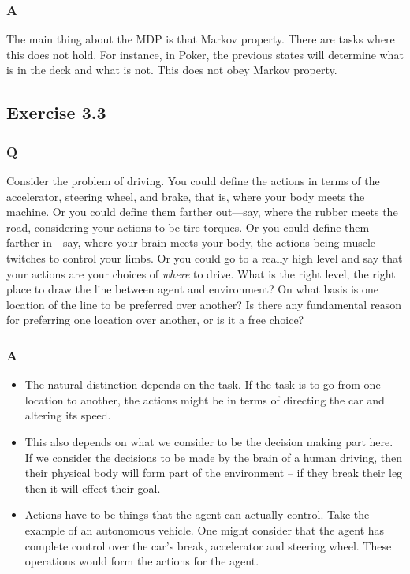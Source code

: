 \subsubsection*{A}
The main thing about the MDP is that Markov property. There are tasks where this does not hold. For instance, in Poker, the previous states will determine what is in the deck and what is not. This does not obey Markov property.

\subsection{Exercise 3.3}
\subsubsection*{Q}
Consider the problem of driving. You could define the actions in terms of the accelerator, steering wheel, and brake, that is, where your body meets the machine. Or you could define them farther out—say, where the rubber meets the road, considering your actions to be tire torques. Or you could define them farther in—say, where your brain meets your body, the actions being muscle twitches to control your limbs. Or you could go to a really high level and say that your actions are your choices of \emph{where} to drive. What is the right level, the right place to draw the line between agent and environment? On what basis is one location of the line to be preferred over another? Is there any fundamental reason for preferring one location over another, or is it a free choice?

\subsubsection*{A}

\begin{itemize}
    \item The natural distinction depends on the task. If the task is to go from one location to another, the actions might be in terms of directing the car and altering its speed. 
    \item This also depends on what we consider to be the decision making part here. If we consider the decisions to be made by the brain of a human driving, then their physical body will form part of the environment -- if they break their leg then it will effect their goal.
    \item Actions have to be things that the agent can actually control. Take the example of an autonomous vehicle. One might consider that the agent has complete control over the car's break, accelerator and steering wheel. These operations would form the actions for the agent. 
\end{itemize}


